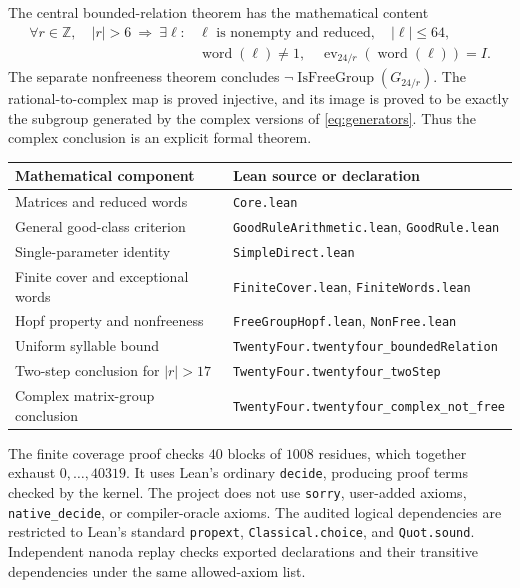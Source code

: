\documentclass[11pt]{article}
\theoremstyle{definition}
\theoremstyle{remark}
\numberwithin{equation}{section}
\newcommand{\Z}{\mathbb Z}
\newcommand{\ev}{\operatorname{ev}}
\begin{document}
The central bounded-relation theorem has the mathematical content
\begin{align*}
 \forall r\in\Z,\quad |r|>6\ \Longrightarrow\ 
 \exists \ell: &\ell\text{ is nonempty and reduced},\quad |\ell|\leq64,\\
 &\operatorname{word}(\ell)\ne1,\quad
 \ev_{24/r}(\operatorname{word}(\ell))=I.
\end{align*}
The separate nonfreeness theorem concludes
$\neg\operatorname{IsFreeGroup}(G_{24/r})$. The rational-to-complex
map is proved injective, and its image is proved to be exactly the
subgroup generated by the complex versions of \eqref{eq:generators}.
Thus the complex conclusion is an explicit formal theorem.

\begin{center}\small
\begin{tabular}{p{}p{}}
\toprule
Mathematical component & Lean source or declaration\\
\midrule
Matrices and reduced words & \texttt{Core.lean}\\[3pt]
General good-class criterion & \texttt{GoodRuleArithmetic.lean}, \texttt{GoodRule.lean}\\[3pt]
Single-parameter identity & \texttt{SimpleDirect.lean}\\[3pt]
Finite cover and exceptional words & \texttt{FiniteCover.lean}, \texttt{FiniteWords.lean}\\[3pt]
Hopf property and nonfreeness & \texttt{FreeGroupHopf.lean}, \texttt{NonFree.lean}\\[3pt]
Uniform syllable bound & \texttt{TwentyFour.twentyfour\_boundedRelation}\\[3pt]
Two-step conclusion for $|r|>17$ & \texttt{TwentyFour.twentyfour\_twoStep}\\[3pt]
Complex matrix-group conclusion & \texttt{TwentyFour.twentyfour\_complex\_not\_free}\\
\bottomrule
\end{tabular}
\end{center}


The finite coverage proof checks $40$ blocks of $1008$ residues,
which together exhaust $0,\ldots,40319$. It uses Lean's ordinary
\texttt{decide}, producing proof terms checked by the kernel.
The project does not use \texttt{sorry}, user-added axioms,
\texttt{native\_decide}, or compiler-oracle axioms. The audited
logical dependencies are restricted to Lean's standard
\texttt{propext}, \texttt{Classical.choice}, and \texttt{Quot.sound}.
Independent nanoda replay checks exported declarations and their
transitive dependencies under the same allowed-axiom list.
\end{document}
